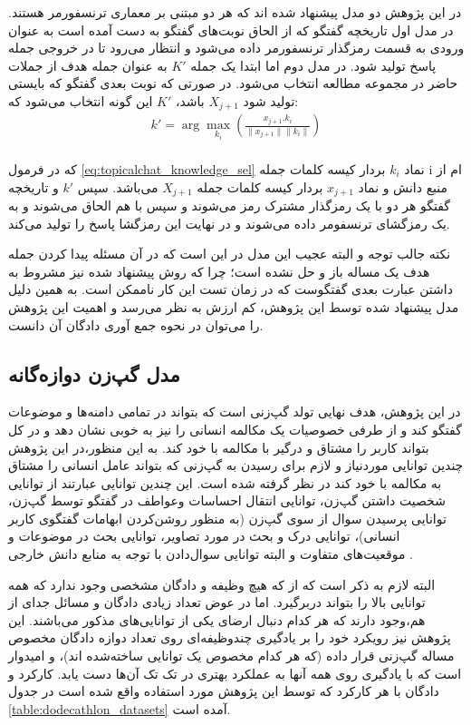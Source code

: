 در این پژوهش دو مدل پیشنهاد شده اند که هر دو مبتنی بر معماری ترنسفورمر هستند. در مدل اول تاریخچه گفتگو که از الحاق نوبت‌های گفتگو به دست آمده است به عنوان ورودی به قسمت رمزگذار ترنسفورمر داده می‌شود و انتظار می‌رود تا در خروجی جمله پاسخ تولید شود.
در مدل دوم اما ابتدا یک جمله 
$K'$ 
به عنوان جمله هدف از جملات حاضر در مجموعه مطالعه انتخاب می‌شود. در صورتی که نوبت‌ بعدی گفتگو که بایستی تولید شود 
$X_{j+1}$
باشد، 
$K'$
این گونه انتخاب می‌شود که:
\\
\begin{gather} \label{eq:topicalchat_knowledge_sel}
k' = \arg\max_{k_i}{
(\frac{x_{j+1}.k_i}{\lVert  x_{j+1}  \rVert 
	\lVert  k_i  \rVert})
}
\end{gather}
\\
که در فرمول 
\ref{eq:topicalchat_knowledge_sel}
نماد‌
$k_i$
بردار کیسه کلمات جمله i ام از منبع دانش و نماد
$x_{j+1}$
بردار کیسه کلمات جمله 
$X_{j+1}$
می‌باشد.
سپس 
$k'$
و تاریخچه گفتگو هر دو با یک رمزگذار مشترک رمز می‌شوند و سپس با هم الحاق می‌شوند و به یک رمز‌گشای ترنسفومر داده می‌شوند و در نهایت این رمزگشا پاسخ را تولید می‌کند. 

نکته جالب توجه و البته عجیب این مدل در این است که در آن مسئله پیدا کردن جمله هدف یک مساله باز و حل نشده است؛ چرا که روش پیشنهاد شده نیز مشروط به داشتن عبارت بعدی گفتگوست که در زمان تست این کار ناممکن است. به همین دلیل مدل پیشنهاد شده توسط این پژوهش، کم ارزش به نظر می‌رسد و اهمیت این پژوهش را می‌توان در نحوه جمع آوری دادگان آن دانست.


\subsection{مدل گپ‌زن دوازه‌گانه}
در این پژوهش، هدف نهایی تولد گپ‌زنی است که بتواند در تمامی دامنه‌ها و موضوعات گفتگو کند و از طرفی خصوصیات یک مکالمه انسانی را نیز به خوبی نشان دهد و در کل بتواند کاربر را مشتاق و درگیر با مکالمه با خود کند. به این منظور،‌در این پژوهش چندین توانایی موردنیاز و لازم برای رسیدن به گپ‌زنی که بتواند عامل انسانی را مشتاق به مکالمه با خود کند در نظر گرفته شده است. این چندین توانایی عبارتند از توانایی شخصیت داشتن گپ‌زن، توانایی انتقال احساسات وعواطف  در گفتگو توسط گپ‌زن، توانایی پرسیدن سوال از سوی گپ‌زن (به منظور روشن‌کردن ابهامات گفتگوی کاربر انسانی)، توانایی درک و بحث در مورد تصاویر، توانایی بحث در موضوعات و موقعیت‌های متفاوت و البته توانایی سوال‌دادن با توجه به منابع دانش خارجی
\cite{dodecathlon_paper}.

البته لازم به ذکر است که از که هیچ وظیفه و دادگان مشخصی وجود ندارد که همه توانایی بالا را بتواند دربرگیرد. اما در عوض تعداد زیادی دادگان و مسائل جدای از هم،‌وجود دارند که هر کدام دنبال ارضای یکی از توانایی‌های مذکور می‌باشند. این پژوهش نیز رویکرد خود را بر یادگیری چندوظیفه‌ای روی تعداد دوازه دادگان مخصوص مساله گپ‌زنی‌ قرار داده (که هر کدام مخصوص یک توانایی ساخته‌شده اند)، و امیدوار است که با یادگیری روی همه آنها به عملکرد بهتری در تک تک آن‌ها دست یابد. کارکرد و دادگان با هر کارکرد که توسط این پژوهش مورد استفاده واقع شده است در جدول 
\ref{table:dodecathlon_datasets}
آمده است.

